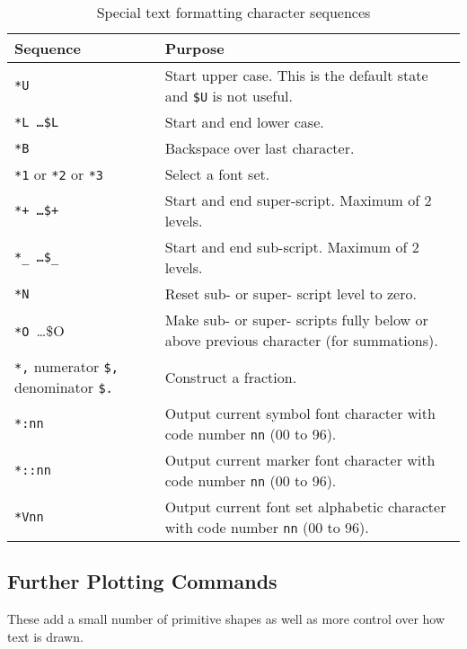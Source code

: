 \documentclass[a4paper,twoside,11pt]{article}
\begin{document}
\begin{table}
\begin{footnotesize}
\centering
\begin{tabular}{|| l | l ||}
\hline
Sequence & Purpose \\
\hline
\texttt{*U} & Start upper case. This is the default state and \texttt{\$U} is not useful.\\
\texttt{*L  \ldots \$L} & Start and end lower case.\\
\texttt{*B} & Backspace over last character.\\
\texttt{*1} or \texttt{*2} or \texttt{*3} & Select a font set.\\
\texttt{*+  \ldots \$+ } & Start and end super-script. Maximum of 2 levels.\\
\texttt{*\_ \ldots \$\_} & Start and end sub-script. Maximum of 2 levels.\\
\texttt{*N} & Reset sub- or super- script level to zero.\\
\texttt{*O }\ldots \$O & Make sub- or super- scripts fully below or above previous character (for summations).\\
\texttt{*,} numerator \texttt{\$,} denominator \texttt{\$.} & Construct a fraction.\\
\texttt{*:nn} & Output current symbol font character with code number \texttt{nn} (00 to 96).\\
\texttt{*::nn} & Output current marker font character with code number \texttt{nn} (00 to 96).\\
\texttt{*Vnn }& Output current font set alphabetic character with code number \texttt{nn} (00 to 96).\\
\hline
\end{tabular}
\caption{Special text formatting character sequences}
\label{tab:textformats}
\end{footnotesize}
\end{table}

\subsection{Further Plotting Commands}
These add a small number of primitive shapes as well as more control over how text is drawn.
\end{document}
